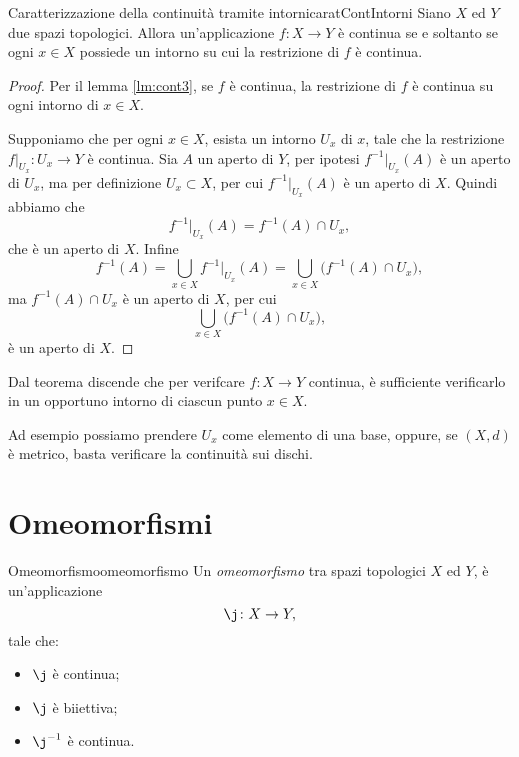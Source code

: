 \begin{prop}{Caratterizzazione della continuità tramite intorni}{caratContIntorni}
	Siano \(X\) ed \(Y\) due spazi topologici.
	Allora un'applicazione \(f\colon X\to Y\) è continua se e soltanto se ogni \(x\in X\) possiede un intorno su cui la restrizione di \(f\) è continua.
\end{prop}

\begin{proof}
	\graffito{\(\Rightarrow)\)}Per il lemma \ref{lm:cont3}, se \(f\) è continua, la restrizione di \(f\) è continua su ogni intorno di \(x\in X\).

	\graffito{\(\Leftarrow)\)}Supponiamo che per ogni \(x\in X\), esista un intorno \(U_x\) di \(x\), tale che la restrizione \(f|_{U_x}\colon U_x\to Y\) è continua.
	Sia \(A\) un aperto di \(Y\), per ipotesi \(f^{-1}|_{U_x}(A)\) è un aperto di \(U_x\), ma per definizione \(U_x\subset X\), per cui \(f^{-1}|_{U_x}(A)\) è un aperto di \(X\).
	Quindi abbiamo che
	\[
		f^{-1}|_{U_x}(A)=f^{-1}(A)\cap U_x,
	\]
	che è un aperto di \(X\).
	Infine
	\[
		f^{-1}(A)=\bigcup_{x\in X}f^{-1}|_{U_x}(A)=\bigcup_{x\in X}\big(f^{-1}(A)\cap U_x\big),
	\]
	ma \(f^{-1}(A)\cap U_x\) è un aperto di \(X\), per cui
	\[
		\bigcup_{x\in X}\big(f^{-1}(A)\cap U_x\big),
	\]
	è un aperto di \(X\).
\end{proof}

\begin{oss}
	Dal teorema discende che per verifcare \(f\colon X\to Y\) continua, è sufficiente verificarlo in un opportuno intorno di ciascun punto \(x\in X\).

	Ad esempio possiamo prendere \(U_x\) come elemento di una base, oppure, se \((X,d)\) è metrico, basta verificare la continuità sui dischi.
\end{oss}
%
%
\section{Omeomorfismi}

\begin{defn}{Omeomorfismo}{omeomorfismo}
	Un \emph{omeomorfismo} tra spazi topologici \(X\) ed \(Y\), è un'applicazione
	\[
		\j\colon X\to Y,
	\]
	tale che:
	\begin{itemize}
		\item \(\j\) è continua;
		\item \(\j\) è biiettiva;
		\item \(\j^{-1}\) è continua.
	\end{itemize}
\end{defn}

